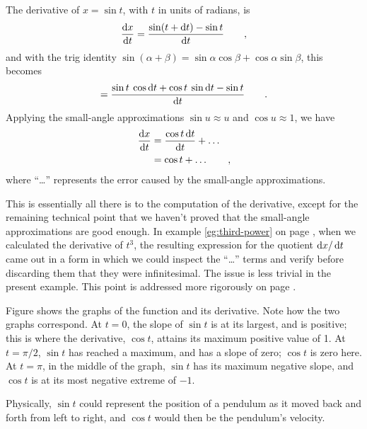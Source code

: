 \begin{eg}\label{eg:derivative-of-sin}
The derivative of $x=\sin t$, with $t$ in units of radians, is
\begin{equation*}
  \frac{\operatorname{d\!} x}{\operatorname{d\!} t} = \frac{\sin(t+\operatorname{d\!} t)-\sin t}{\operatorname{d\!} t} \qquad , 
\end{equation*}
and with the trig identity $\sin(\alpha+\beta)=\sin\alpha\cos\beta+\cos\alpha\sin\beta$, this becomes
\begin{equation*}
                        = \frac{\sin t \: \cos \operatorname{d\!} t + \cos t \: \sin \operatorname{d\!} t - \sin t}{\operatorname{d\!} t} \qquad .
\end{equation*}
Applying the small-angle approximations $\sin u\approx u$ and $\cos u\approx 1$,
we have
\begin{align*}
\frac{\operatorname{d\!} x}{\operatorname{d\!} t}   &= \frac{\cos t \operatorname{d\!} t}{\operatorname{d\!} t} + \ldots\\
                        &= \cos t + \ldots \qquad ,
\end{align*}
where ``\ldots'' represents the error caused by the small-angle approximations.

This is essentially all there is to the computation of the derivative, except for the remaining technical
point that we haven't proved that the small-angle approximations are good enough. In example \ref{eg:third-power} on page \pageref{eg:third-power},
when we calculated the derivative of $t^3$, the resulting expression for the quotient $\operatorname{d\!} x/\operatorname{d\!} t$
came out in a form in which we could inspect the ``\ldots'' terms and verify before discarding them that they were infinitesimal.
The issue is less trivial in the present example.
This point is addressed more rigorously on page \pageref{detour:sin-rigor}.

Figure  shows the graphs of the function and its derivative. Note how the two
graphs correspond. At $t=0$, the slope of $\sin t$ is at its largest, and is positive; this is where
the derivative, $\cos t$, attains its maximum positive value of 1. At $t=\pi/2$, $\sin t$ has reached
a maximum, and has a slope of zero; $\cos t$ is zero here. At $t=\pi$, in the middle of the graph,
$\sin t$ has its maximum negative slope, and $\cos t$ is at its most negative extreme of $-1$.

Physically, $\sin t$ could represent the position of a pendulum as it moved back and forth from left
to right, and $\cos t$ would then be the pendulum's velocity.
\end{eg}


